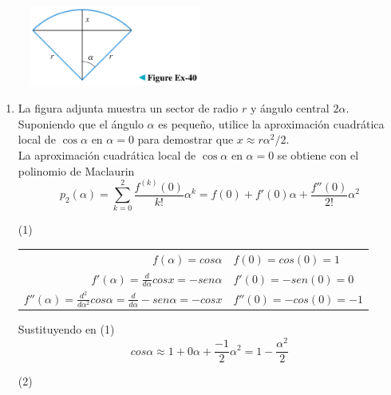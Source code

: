 \documentclass[12pt]{article}
\begin{document}
\begin{figure}[h!]
\centering
\includegraphics[width=0.5\textwidth]{../img/img_Lista2/2_40.png}
\end{figure}
\begin{enumerate}[label=(\alph*)]
\item La figura adjunta muestra un sector de radio $r$ y ángulo central $2 \alpha$. Suponiendo que el ángulo $\alpha$ es pequeño, utilice la aproximación cuadrática local de $\cos \alpha$ en $\alpha = 0$ para demostrar que $x \approx r \alpha ^2/2$. \\
La aproximación cuadrática local de $\cos \alpha$ en $\alpha = 0$ se obtiene con el polinomio de Maclaurin
\[
p_2(\alpha) = \sum_{k=0}^{2}\frac{f^{(k)} (0)}{k!} \alpha^k =  f(0) + f'(0)\alpha+ \frac{f''(0)}{2!}\alpha^2 
\] 
\begin{flushright}
(1)
\end{flushright}
\begin{center}
  \begin{tabular}{r l}
   $f(\alpha) = cos\alpha $ & $ f(0) = cos(0) = 1$ \\
   $f'(\alpha) = \frac{d}{d\alpha} cosx = -sen\alpha$ & $ f'(0) = -sen(0) = 0$ \\
   $f''(\alpha) = \frac{d^2}{d\alpha^2} cos \alpha = \frac{d}{d\alpha} -sen \alpha = -cosx$ & $ f''(0) = -cos(0) = -1$ \\
  \end{tabular}
\end{center}
Sustituyendo en (1)
\[
cos\alpha \approx 1 + 0 \alpha+ \frac{-1}{2}\alpha^2 = 1 - \frac{\alpha^2}{2} 
\]
\begin{flushright}
(2)
\end{flushright}



\end{enumerate}
\end{document}
